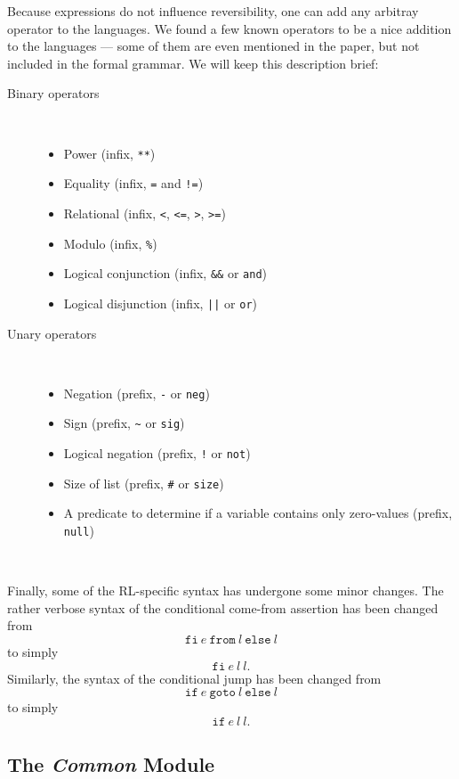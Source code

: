 \noindent Because expressions do not influence reversibility, one can add any arbitray operator to the languages. We found a few known operators to be a nice addition to the languages --- some of them are even mentioned in the paper, but not included in the formal grammar. We will keep this description brief:
\begin{description}
\item[Binary operators]~
  \begin{itemize}
  \item Power (infix, \texttt{**})
  \item Equality (infix, \texttt{=} and \texttt{!=})
  \item Relational (infix, \texttt{<}, \texttt{<=}, \texttt{>}, \texttt{>=})
  \item Modulo (infix, \texttt{\%})
  \item Logical conjunction (infix, \texttt{\&\&} or \texttt{and})
  \item Logical disjunction (infix, \texttt{||} or \texttt{or})
\end{itemize}
\item[Unary operators]~
\begin{itemize}
  \item Negation (prefix, \texttt{-} or \texttt{neg})
  \item Sign (prefix, \texttt{\~} or \texttt{sig})
  \item Logical negation (prefix, \texttt{!} or \texttt{not})
  \item Size of list (prefix, \texttt{\#} or \texttt{size})
  \item A predicate to determine if a variable contains only zero-values (prefix, \texttt{null})
\end{itemize}
\end{description}~

\noindent Finally, some of the RL-specific syntax has undergone some minor changes. The rather verbose syntax of the conditional come-from assertion has been changed from
\[\texttt{fi} \ e \ \texttt{from} \ l \ \texttt{else} \ l\]
\noindent to simply
\[\texttt{fi} \ e \ l \ l.\]
\noindent Similarly, the syntax of the conditional jump has been changed from
\[\texttt{if} \ e \ \texttt{goto} \ l \ \texttt{else} \ l\]
\noindent to simply
\[\texttt{if} \ e \ l \ l.\]

\subsection{The \textit{Common} Module}

